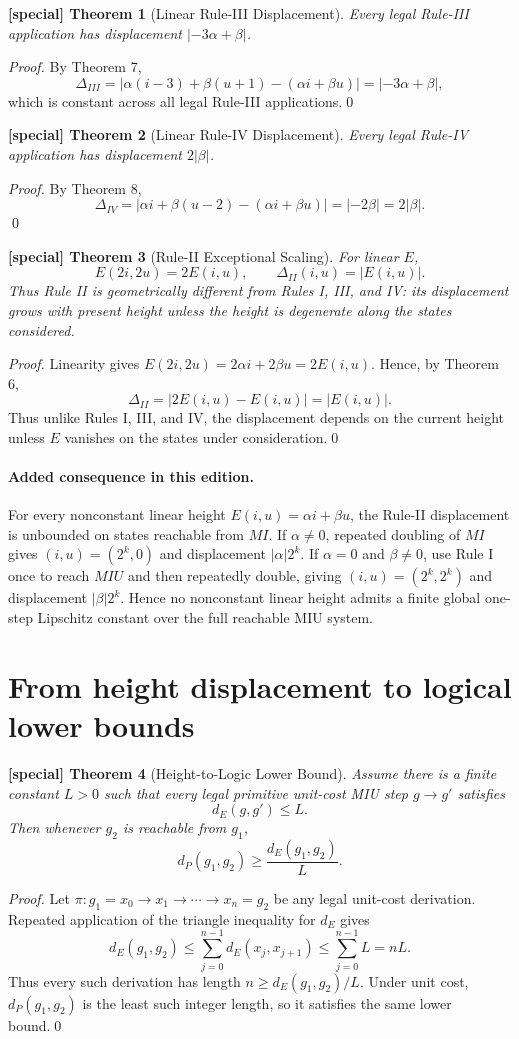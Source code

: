 \documentclass[11pt]{article}
\newtheorem{spthm}{[special] Theorem}
\newcommand{\dE}{d_E}
\newcommand{\dP}{d_P}
\begin{document}
\begin{spthm}[Linear Rule-III Displacement]
Every legal Rule-III application has displacement $|-3\alpha+\beta|$.
\end{spthm}
\textit{Proof.} By Theorem 7,
\[
\Delta_{III}=|\alpha(i-3)+\beta(u+1)-(\alpha i+\beta u)|=|-3\alpha+\beta|,
\]
which is constant across all legal Rule-III applications.\qed

\begin{spthm}[Linear Rule-IV Displacement]
Every legal Rule-IV application has displacement $2|\beta|$.
\end{spthm}
\textit{Proof.} By Theorem 8,
\[
\Delta_{IV}=|\alpha i+\beta(u-2)-(\alpha i+\beta u)|=|-2\beta|=2|\beta|.
\]\qed

\begin{spthm}[Rule-II Exceptional Scaling]
For linear $E$,
\[E(2i,2u)=2E(i,u),\qquad \Delta_{II}(i,u)=|E(i,u)|.\]
Thus Rule II is geometrically different from Rules I, III, and IV: its displacement grows with present height unless the height is degenerate along the states considered.
\end{spthm}
\textit{Proof.} Linearity gives $E(2i,2u)=2\alpha i+2\beta u=2E(i,u)$. Hence, by Theorem 6,
\[
\Delta_{II}=|2E(i,u)-E(i,u)|=|E(i,u)|.
\]
Thus unlike Rules I, III, and IV, the displacement depends on the current height unless $E$ vanishes on the states under consideration.\qed


\paragraph{Added consequence in this edition.}
For every nonconstant linear height $E(i,u)=\alpha i+\beta u$, the Rule-II displacement is unbounded on states reachable from $MI$. If $\alpha\ne0$, repeated doubling of $MI$ gives $(i,u)=(2^k,0)$ and displacement $|\alpha|2^k$. If $\alpha=0$ and $\beta\ne0$, use Rule I once to reach $MIU$ and then repeatedly double, giving $(i,u)=(2^k,2^k)$ and displacement $|\beta|2^k$. Hence no nonconstant linear height admits a finite global one-step Lipschitz constant over the full reachable MIU system.

\section{From height displacement to logical lower bounds}
\begin{spthm}[Height-to-Logic Lower Bound]
Assume there is a finite constant $L>0$ such that every legal primitive unit-cost MIU step $g\to g'$ satisfies
\[\dE(g,g')\le L.\]
Then whenever $g_2$ is reachable from $g_1$,
\[\dP(g_1,g_2)\ge \frac{\dE(g_1,g_2)}{L}.\]
\end{spthm}
\textit{Proof.} Let $\pi:g_1=x_0\to x_1\to\cdots\to x_n=g_2$ be any legal unit-cost derivation. Repeated application of the triangle inequality for $\dE$ gives
\[
\dE(g_1,g_2)\le\sum_{j=0}^{n-1}\dE(x_j,x_{j+1})\le\sum_{j=0}^{n-1}L=nL.
\]
Thus every such derivation has length $n\ge \dE(g_1,g_2)/L$. Under unit cost, $d_P(g_1,g_2)$ is the least such integer length, so it satisfies the same lower bound.\qed
\end{document}
